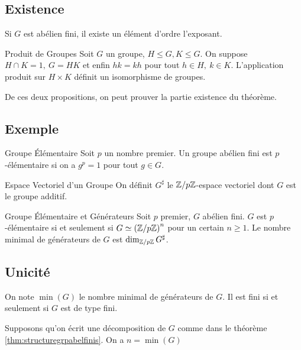 \documentclass{cours}
\begin{document}
\subsection{Existence}
\begin{lemma}
    Si $G$ est abélien fini, il existe un élément d'ordre l'exposant.
\end{lemma}

\begin{propositionfr}{Produit de Groupes}{}
    Soit $G$ un groupe, $H\leq G, K \leq G$. On suppose $H \cap K = 1, \ G = HK$ et enfin $hk = kh$ pour tout $h \in H,\ k \in K$. L'application produit sur $H \times K$ définit un isomorphisme de groupes.
\end{propositionfr}

De ces deux propositions, on peut prouver la partie existence du théorème.

\subsection{Exemple}
\begin{définition}{Groupe Élémentaire}{}
    Soit $p$ un nombre premier. Un groupe abélien fini est $p$-élémentaire si on a $g^{p} = 1$ pour tout $g \in G$.
\end{définition}

\begin{définition}{Espace Vectoriel d'un Groupe}{}
    On définit $G^{\sharp}$ le $\mathbb{Z}/p\mathbb{Z}$-espace vectoriel dont $G$ est le groupe additif.
\end{définition}

\begin{propositionfr}{Groupe Élémentaire et Générateurs}{}
    Soit $p$ premier, $G$ abélien fini. $G$ est $p$-élémentaire si et seulement si $G \simeq \left(\mathbb{Z}/p\mathbb{Z}\right)^{n}$ pour un certain $n \geq 1$. Le nombre minimal de générateurs de $G$ est $\dim_{\mathbb{Z}/p\mathbb{Z}}G^{\sharp}$.
\end{propositionfr}

\subsection{Unicité}
\begin{définition}{}{}
    On note $\min(G)$ le nombre minimal de générateurs de $G$. Il est fini si et seulement si $G$ est de type fini.
\end{définition}
\begin{propositionfr}{}{}
    Supposons qu'on écrit une décomposition de $G$ comme dans le théorème \ref{thm:structuregrpabelfinis}. On a $n = \min{(G)}$
\end{propositionfr}
\end{document}
